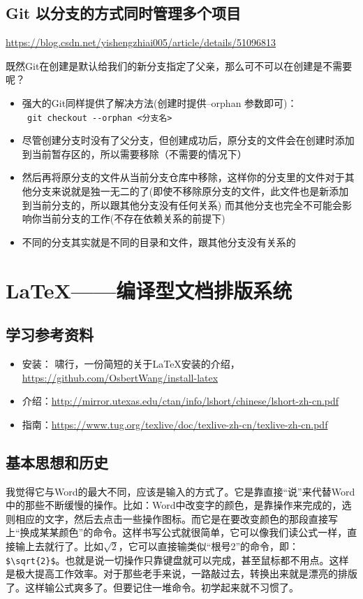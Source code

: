 \section{Git 以分支的方式同时管理多个项目}
\url{https://blog.csdn.net/yishengzhiai005/article/details/51096813}

既然Git在创建是默认给我们的新分支指定了父亲，那么可不可以在创建是不需要呢？

\begin{itemize}
\item 强大的Git同样提供了解决方法(创建时提供--orphan 参数即可)：\\
\verb| git checkout --orphan <分支名>|
\item 尽管创建分支时没有了父分支，但创建成功后，原分支的文件会在创建时添加到当前暂存区的，所以需要移除（不需要的情况下）
\item 然后再将原分支的文件从当前分支仓库中移除，这样你的分支里的文件对于其他分支来说就是独一无二的了(即使不移除原分支的文件，此文件也是新添加到当前分支的，所以跟其他分支没有任何关系)
而其他分支也完全不可能会影响你当前分支的工作(不存在依赖关系的前提下)
\item 不同的分支其实就是不同的目录和文件，跟其他分支没有关系的
\end{itemize}








\chapter{\LaTeX{}——编译型文档排版系统}
\section{学习参考资料}
\begin{itemize}
\item 安装： 啸行，一份简短的关于\LaTeX{}安装的介绍，\url{https://github.com/OsbertWang/install-latex}
\item 介绍：\url{http://mirror.utexas.edu/ctan/info/lshort/chinese/lshort-zh-cn.pdf}
\item 指南：\url{https://www.tug.org/texlive/doc/texlive-zh-cn/texlive-zh-cn.pdf}
\end{itemize}


\section{基本思想和历史}
我觉得它与Word的最大不同，应该是输入的方式了。它是靠直接“说”来代替Word中的那些不断缓慢的操作。比如：Word中改变字的颜色，是靠操作来完成的，选则相应的文字，然后去点击一些操作图标。而它是在要改变颜色的那段直接写上“换成某某颜色”的命令。这样书写公式就很简单，它可以像我们读公式一样，直接输上去就行了。比如$\sqrt{2}$，它可以直接输类似“根号2”的命令，即：\verb|$\sqrt{2}$|。也就是说一切操作只靠键盘就可以完成，甚至鼠标都不用点。这样是极大提高工作效率。对于那些老手来说，一路敲过去，转换出来就是漂亮的排版了。这样输公式爽多了。但要记住一堆命令。初学起来就不习惯了。

